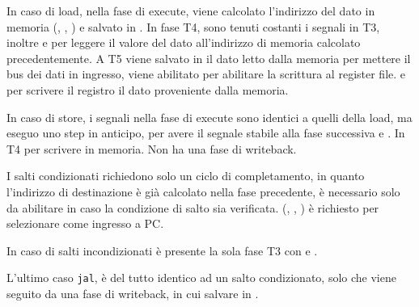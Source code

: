 \documentclass[../ace.tex]{subfiles}
\begin{document}
In caso di load, nella fase di execute, viene calcolato l'indirizzo del dato in memoria  (, , ) e salvato in .
In fase T4, sono tenuti costanti i segnali in T3, inoltre  e  per leggere il valore del dato all'indirizzo di memoria calcolato precedentemente.
A T5 viene salvato in  il dato letto dalla memoria  per mettere il bus dei dati in ingresso, viene abilitato  per abilitare la scrittura al register file.
 e  per scrivere il registro  il dato proveniente dalla memoria.

In caso di store, i segnali nella fase di execute sono identici a quelli della load, ma eseguo  uno step in anticipo, per avere il segnale stabile alla fase successiva e .
In T4  per scrivere in memoria. Non ha una fase di writeback.

I salti condizionati richiedono solo un ciclo di completamento, in quanto l'indirizzo di destinazione è già calcolato nella fase precedente, è necessario solo da abilitare  in caso la condizione di salto sia verificata.
(, , )  è richiesto per selezionare  come ingresso a PC.

In caso di salti incondizionati è presente la sola fase T3 con  e .

L'ultimo caso \lstinline{jal}, è del tutto identico ad un salto condizionato, solo che viene seguito da una fase di
writeback, in cui salvare  in .
\end{document}
